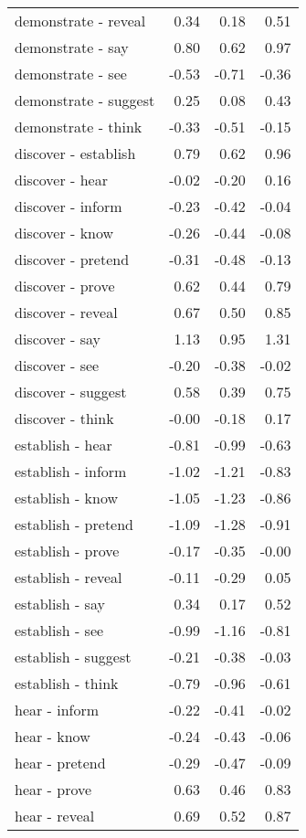 \begin{longtable}{lrrr}
  demonstrate - reveal & 0.34 & 0.18 & 0.51 \\ 
  demonstrate - say & 0.80 & 0.62 & 0.97 \\ 
  demonstrate - see & -0.53 & -0.71 & -0.36 \\ 
  demonstrate - suggest & 0.25 & 0.08 & 0.43 \\ 
  demonstrate - think & -0.33 & -0.51 & -0.15 \\ 
  discover - establish & 0.79 & 0.62 & 0.96 \\ 
  discover - hear & -0.02 & -0.20 & 0.16 \\ 
  discover - inform & -0.23 & -0.42 & -0.04 \\ 
  discover - know & -0.26 & -0.44 & -0.08 \\ 
  discover - pretend & -0.31 & -0.48 & -0.13 \\ 
  discover - prove & 0.62 & 0.44 & 0.79 \\ 
  discover - reveal & 0.67 & 0.50 & 0.85 \\ 
  discover - say & 1.13 & 0.95 & 1.31 \\ 
  discover - see & -0.20 & -0.38 & -0.02 \\ 
  discover - suggest & 0.58 & 0.39 & 0.75 \\ 
  discover - think & -0.00 & -0.18 & 0.17 \\ 
  establish - hear & -0.81 & -0.99 & -0.63 \\ 
  establish - inform & -1.02 & -1.21 & -0.83 \\ 
  establish - know & -1.05 & -1.23 & -0.86 \\ 
  establish - pretend & -1.09 & -1.28 & -0.91 \\ 
  establish - prove & -0.17 & -0.35 & -0.00 \\ 
  establish - reveal & -0.11 & -0.29 & 0.05 \\ 
  establish - say & 0.34 & 0.17 & 0.52 \\ 
  establish - see & -0.99 & -1.16 & -0.81 \\ 
  establish - suggest & -0.21 & -0.38 & -0.03 \\ 
  establish - think & -0.79 & -0.96 & -0.61 \\ 
  hear - inform & -0.22 & -0.41 & -0.02 \\ 
  hear - know & -0.24 & -0.43 & -0.06 \\ 
  hear - pretend & -0.29 & -0.47 & -0.09 \\ 
  hear - prove & 0.63 & 0.46 & 0.83 \\ 
  hear - reveal & 0.69 & 0.52 & 0.87 \\ 

\end{longtable}
